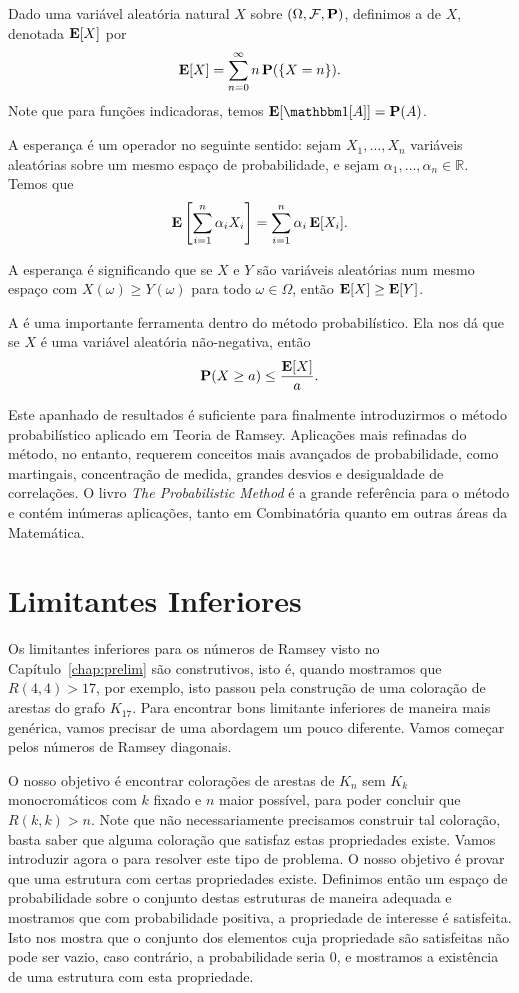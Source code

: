 Dado uma variável aleatória natural $X$ sobre $(\Omega, \mathcal{F}, \operatorname{\mathbf{P}})$, definimos a  de $X$, denotada $\operatorname{\mathbf{E}}[X]$ por
\[ \operatorname{\mathbf{E}}[X] = \sum_{n = 0}^{\infty} n \operatorname{\mathbf{P}}(\{X = n\}).\]
Note que para funções indicadoras, temos $\expec[\ind{A}] = \prob(A)$.

A esperança é um operador  no seguinte sentido: sejam $X_1, \dots, X_n$ variáveis aleatórias sobre um mesmo espaço de probabilidade, e sejam $\alpha_1, \dots, \alpha_n \in \mathbb{R}$. Temos que
\[ \operatorname{\mathbf{E}}\left[ \sum_{i=1}^n \alpha_i X_i \right] = \sum_{i = 1}^{n} \alpha_i \operatorname{\mathbf{E}}[X_i]. \]

A esperança é  significando que se $X$ e $Y$ são variáveis aleatórias num mesmo espaço com $X(\omega) \geq Y(\omega)$ para todo $\omega \in \Omega$, então $\operatorname{\mathbf{E}}[X] \geq \operatorname{\mathbf{E}}[Y]$.

A  é uma importante ferramenta dentro do método probabilístico. Ela nos dá que se $X$ é uma variável aleatória não-negativa, então
\[ \operatorname{\mathbf{P}}(X \geq a) \leq \frac{\operatorname{\mathbf{E}}[X]}{a}. \]

Este apanhado de resultados é suficiente para finalmente introduzirmos o método probabilístico aplicado em Teoria de Ramsey. Aplicações mais refinadas do método, no entanto, requerem conceitos mais avançados de probabilidade, como martingais, concentração de medida, grandes desvios e desigualdade de correlações. O livro \emph{The Probabilistic Method} \cite{alon} é a grande referência para o método e contém inúmeras aplicações, tanto em Combinatória quanto em outras áreas da Matemática.


\section{Limitantes Inferiores}

Os limitantes inferiores para os números de Ramsey visto no Capítulo~\ref{chap:prelim} são construtivos, isto é, quando mostramos que $R(4,4) > 17$, por exemplo, isto passou pela construção de uma coloração de arestas do grafo $K_{17}$. Para encontrar bons limitante inferiores de maneira mais genérica, vamos precisar de uma abordagem um pouco diferente. Vamos começar pelos números de Ramsey diagonais.

O nosso objetivo é encontrar colorações de arestas de $K_n$ sem $K_k$ monocromáticos com $k$ fixado e $n$ maior possível, para poder concluir que $R(k,k) > n$. Note que não necessariamente precisamos construir tal coloração, basta saber que alguma coloração que satisfaz estas propriedades existe. Vamos introduzir agora o  para resolver este tipo de problema. O nosso objetivo é provar que uma estrutura com certas propriedades existe. Definimos então um espaço de probabilidade sobre o conjunto destas estruturas de maneira adequada e mostramos que com probabilidade positiva, a propriedade de interesse é satisfeita. Isto nos mostra que o conjunto dos elementos cuja propriedade são satisfeitas não pode ser vazio, caso contrário, a probabilidade seria 0, e mostramos a existência de uma estrutura com esta propriedade.

